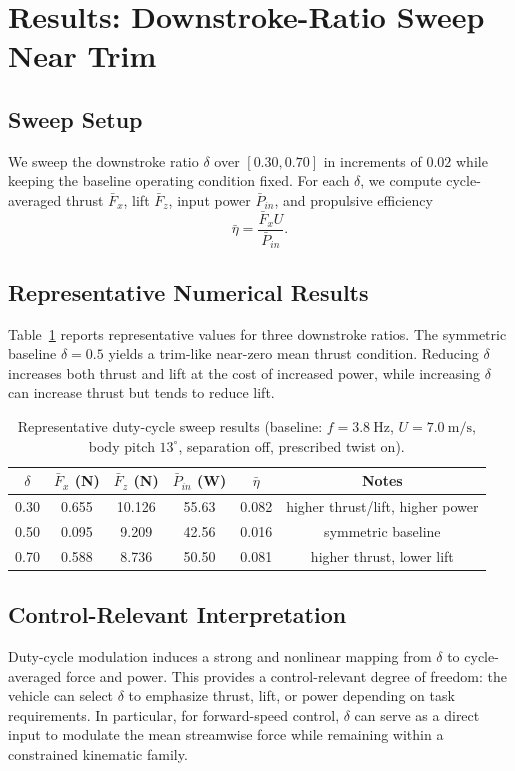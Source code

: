 \section{Results: Downstroke-Ratio Sweep Near Trim}
\subsection{Sweep Setup}
We sweep the downstroke ratio $\delta$ over $[0.30,0.70]$ in increments of $0.02$ while keeping the baseline operating condition fixed.
For each $\delta$, we compute cycle-averaged thrust $\bar{F}_x$, lift $\bar{F}_z$, input power $\bar{P}_{in}$, and propulsive efficiency
\begin{equation}
\bar{\eta} = \frac{\bar{F}_x U}{\bar{P}_{in}}.
\end{equation}

\subsection{Representative Numerical Results}
Table~\ref{tab:delta_points} reports representative values for three downstroke ratios.
The symmetric baseline $\delta=0.5$ yields a trim-like near-zero mean thrust condition.
Reducing $\delta$ increases both thrust and lift at the cost of increased power, while increasing $\delta$ can increase thrust but tends to reduce lift.

\begin{table}[t]
\centering
\caption{Representative duty-cycle sweep results (baseline: $f=3.8~\mathrm{Hz}$, $U=7.0~\mathrm{m/s}$, body pitch $13^\circ$, separation off, prescribed twist on).}
\label{tab:delta_points}
\begin{tabular}{@{}cccccc@{}}
\toprule
$\delta$ & $\bar{F}_x$ (N) & $\bar{F}_z$ (N) & $\bar{P}_{in}$ (W) & $\bar{\eta}$ & Notes \\
\midrule
0.30 & 0.655 & 10.126 & 55.63 & 0.082 & higher thrust/lift, higher power \\
0.50 & 0.095 & 9.209 & 42.56 & 0.016 & symmetric baseline \\
0.70 & 0.588 & 8.736 & 50.50 & 0.081 & higher thrust, lower lift \\
\bottomrule
\end{tabular}
\end{table}

\subsection{Control-Relevant Interpretation}
Duty-cycle modulation induces a strong and nonlinear mapping from $\delta$ to cycle-averaged force and power.
This provides a control-relevant degree of freedom: the vehicle can select $\delta$ to emphasize thrust, lift, or power depending on task requirements.
In particular, for forward-speed control, $\delta$ can serve as a direct input to modulate the mean streamwise force while remaining within a constrained kinematic family.

